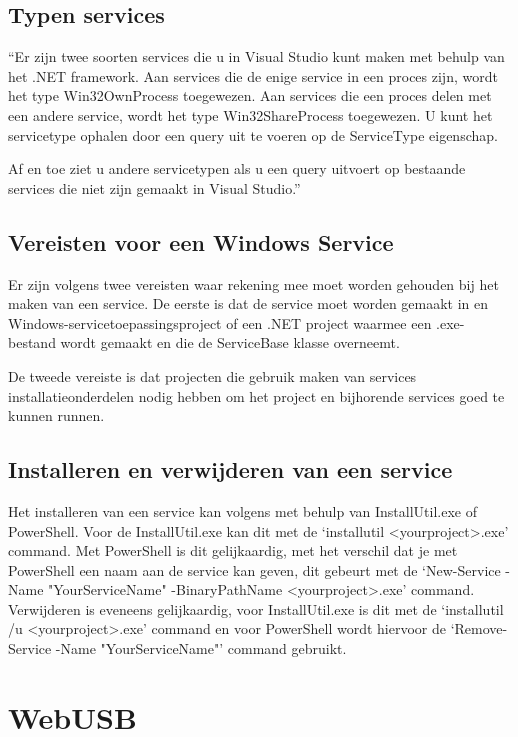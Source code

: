 \subsection{Typen services}
``Er zijn twee soorten services die u in Visual Studio kunt maken met behulp van het .NET framework. Aan services die de enige service in een proces zijn, wordt het type Win32OwnProcess toegewezen. Aan services die een proces delen met een andere service, wordt het type Win32ShareProcess toegewezen. U kunt het servicetype ophalen door een query uit te voeren op de ServiceType eigenschap. 

Af en toe ziet u andere servicetypen als u een query uitvoert op bestaande services die niet zijn gemaakt in Visual Studio.''\autocite{DevMozService}

\subsection{Vereisten voor een Windows Service}
Er zijn volgens \textcite{DevMozService} twee vereisten waar rekening mee moet worden gehouden bij het maken van een service. De eerste is dat de service moet worden gemaakt in en Windows-servicetoepassingsproject of een .NET project waarmee een .exe-bestand wordt gemaakt en die de ServiceBase klasse overneemt. 

De tweede vereiste is dat projecten die gebruik maken van services installatieonderdelen nodig hebben om het project en bijhorende services goed te kunnen runnen. 

\subsection{Installeren en verwijderen van een service}
Het installeren van een service kan volgens \textcite{DevMozServiceInstall} met behulp van InstallUtil.exe of PowerShell. Voor de InstallUtil.exe kan dit met de ‘installutil <yourproject>.exe’ command. Met PowerShell is dit gelijkaardig, met het verschil dat je met PowerShell een naam aan de service kan geven, dit gebeurt met de ‘New-Service -Name "YourServiceName" -BinaryPathName <yourproject>.exe’ command. Verwijderen is eveneens gelijkaardig, voor InstallUtil.exe is dit met de ‘installutil /u <yourproject>.exe’ command en voor PowerShell wordt hiervoor de ‘Remove-Service -Name "YourServiceName"’ command gebruikt. 





\section{WebUSB}
